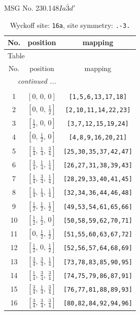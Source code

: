 \documentclass[fleqn,8pt]{jsarticle}
\begin{document}
\setcounter{MaxMatrixCols}{32}

\renewcommand{\tablename}{Table~}
\renewcommand{\figurename}{Figure~}
\begin{center}
\LARGE
MSG No. 230.148\quad$Ia\bar{3}d'$
\end{center}
\renewcommand{\arraystretch}{1.2}
\begin{longtable}{ccc}
\caption{Wyckoff site: {\tt 16a}, site symmetry: {\tt .-3.}}
 \\
 \hline \hline
No. & position & mapping \\ \hline \endfirsthead

\multicolumn{2}{l}{\tablename\ \thetable{}} \\
 \hline \hline
No. & position & mapping \\ \hline \endhead

 \hline \hline
\multicolumn{2}{r}{\footnotesize\it continued ...} \\ \endfoot

 \hline \hline
\multicolumn{2}{r}{} \\ \endlastfoot

1 & $\left[ 0,\, 0,\, 0 \right]$ & {\tt [1,5,6,13,17,18]} \\ \hline
2 & $\left[ 0,\, 0,\, \frac{1}{2} \right]$ & {\tt [2,10,11,14,22,23]} \\ \hline
3 & $\left[ \frac{1}{2},\, 0,\, 0 \right]$ & {\tt [3,7,12,15,19,24]} \\ \hline
4 & $\left[ 0,\, \frac{1}{2},\, 0 \right]$ & {\tt [4,8,9,16,20,21]} \\ \hline
5 & $\left[ \frac{1}{4},\, \frac{1}{4},\, \frac{3}{4} \right]$ & {\tt [25,30,35,37,42,47]} \\ \hline
6 & $\left[ \frac{3}{4},\, \frac{1}{4},\, \frac{1}{4} \right]$ & {\tt [26,27,31,38,39,43]} \\ \hline
7 & $\left[ \frac{1}{4},\, \frac{3}{4},\, \frac{1}{4} \right]$ & {\tt [28,29,33,40,41,45]} \\ \hline
8 & $\left[ \frac{1}{4},\, \frac{1}{4},\, \frac{1}{4} \right]$ & {\tt [32,34,36,44,46,48]} \\ \hline
9 & $\left[ \frac{1}{2},\, \frac{1}{2},\, \frac{1}{2} \right]$ & {\tt [49,53,54,61,65,66]} \\ \hline
10 & $\left[ \frac{1}{2},\, \frac{1}{2},\, 0 \right]$ & {\tt [50,58,59,62,70,71]} \\ \hline
11 & $\left[ 0,\, \frac{1}{2},\, \frac{1}{2} \right]$ & {\tt [51,55,60,63,67,72]} \\ \hline
12 & $\left[ \frac{1}{2},\, 0,\, \frac{1}{2} \right]$ & {\tt [52,56,57,64,68,69]} \\ \hline
13 & $\left[ \frac{3}{4},\, \frac{3}{4},\, \frac{1}{4} \right]$ & {\tt [73,78,83,85,90,95]} \\ \hline
14 & $\left[ \frac{1}{4},\, \frac{3}{4},\, \frac{3}{4} \right]$ & {\tt [74,75,79,86,87,91]} \\ \hline
15 & $\left[ \frac{3}{4},\, \frac{1}{4},\, \frac{3}{4} \right]$ & {\tt [76,77,81,88,89,93]} \\ \hline
16 & $\left[ \frac{3}{4},\, \frac{3}{4},\, \frac{3}{4} \right]$ & {\tt [80,82,84,92,94,96]} \\
\end{longtable}
\end{document}
